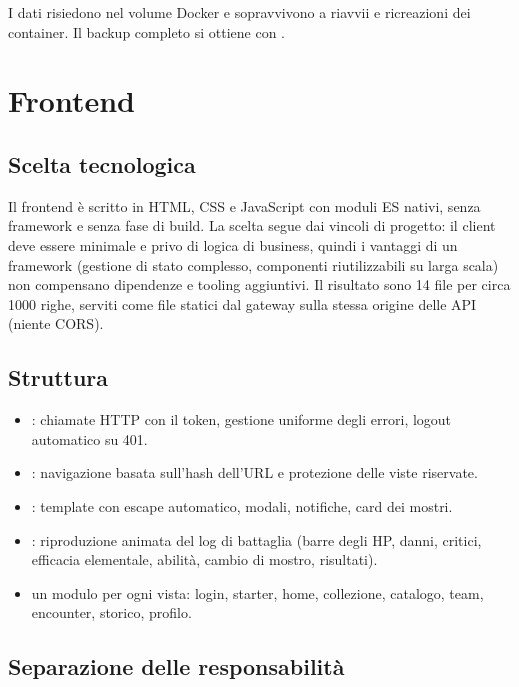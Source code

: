 \documentclass[11pt,a4paper]{report}
\begin{document}
I dati risiedono nel volume Docker  e sopravvivono a riavvii e ricreazioni dei container. Il backup completo si ottiene con .

\chapter{Frontend}

\section{Scelta tecnologica}

Il frontend è scritto in HTML, CSS e JavaScript con moduli ES nativi, senza framework e senza fase di build. La scelta segue dai vincoli di progetto: il client deve essere minimale e privo di logica di business, quindi i vantaggi di un framework (gestione di stato complesso, componenti riutilizzabili su larga scala) non compensano dipendenze e tooling aggiuntivi. Il risultato sono 14 file per circa 1000 righe, serviti come file statici dal gateway sulla stessa origine delle API (niente CORS).

\section{Struttura}

\begin{itemize}
  \item {}: chiamate HTTP con il token, gestione uniforme degli errori, logout automatico su 401.
  \item {}: navigazione basata sull'hash dell'URL e protezione delle viste riservate.
  \item {}: template con escape automatico, modali, notifiche, card dei mostri.
  \item {}: riproduzione animata del log di battaglia (barre degli HP, danni, critici, efficacia elementale, abilità, cambio di mostro, risultati).
  \item un modulo per ogni vista: login, starter, home, collezione, catalogo, team, encounter, storico, profilo.
\end{itemize}

\section{Separazione delle responsabilità}
\end{document}
